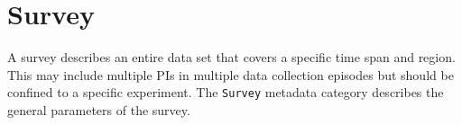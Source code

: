 \documentclass[12pt]{article}
\newcommand{\entry}[7]{
	\textbf{#1} 
	\begin{itemize}[topsep=5pt,itemsep=-.1pt,parsep=-2pt,partopsep=0pt,labelwidth=2em,align=left,itemindent=1em]
		\begin{small}
			\item[Required:] #2
			\item[Units:] #3
			\item[Type:] #4
			\item[Style:] #5
		\end{small}
	\end{itemize} & #6 & #7 \\ \midrule}
\begin{document}

\clearpage
\newpage
\section{Survey}

A survey describes an entire data set that covers a specific time span and region. This may include multiple PIs in multiple data collection episodes but should be confined to a specific experiment. The \verb|Survey| metadata category describes the general parameters of the survey.
\end{document}
